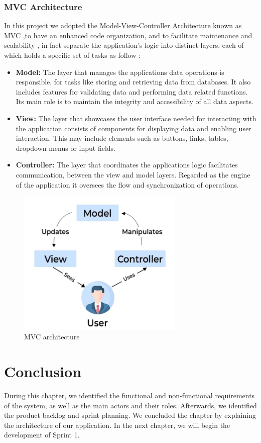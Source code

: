 \subsubsection{MVC Architecture}
In this project we adopted the Model-View-Controller Architecture known as MVC ,to have an enhanced code organization, and to facilitate maintenance and scalability , in fact separate the application's logic into distinct layers, each of which holds a specific set of tasks as follow :
\begin{itemize}
    \item \textbf{Model:} The layer that manages the applications data operations is responsible, for tasks like storing and retrieving data from databases. It also includes features for validating data and performing data related functions. Its main role is to maintain the integrity and accessibility of all data aspects.

    \item \textbf{View: }The layer that showcases the user interface needed for interacting with the application consists of components for displaying data and enabling user interaction. This may include elements such as buttons, links, tables, dropdown menus or input fields.

    \item \textbf{Controller: }The layer that coordinates the applications logic facilitates communication, between the view and model layers. Regarded as the engine of the application it oversees the flow and synchronization of operations.

\end{itemize}
\begin{figure}[H]
    \centering
    \includegraphics[height=7cm]{images/chap1/mvc.png}
    \caption{MVC architecture}
    \label{fig:enter-label}
\end{figure}






\section*{Conclusion}

During this chapter, we identified the functional and non-functional requirements of the system, as well as the main actors and their roles. Afterwards, we identified the product backlog and sprint planning. We concluded the chapter by explaining the architecture of our application. In the next chapter, we will begin the development of Sprint 1.
